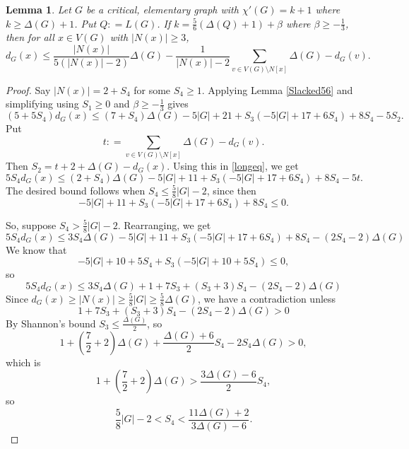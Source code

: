 \documentclass[12pt]{amsart}
\theoremstyle{plain}
\newtheorem{lem}[thm]{Lemma}
\theoremstyle{definition}
\theoremstyle{remark}
\newcommand{\card}[1]{\left|#1\right|}
\newcommand{\parens}[1]{\left( #1 \right)}
\newcommand{\DefinedAs}{\mathrel{\mathop:}=}
\begin{document}
\begin{lem}\label{DegreeBoundedForMiddling}
Let $G$ be a critical, elementary graph with $\chi'(G) = k + 1$ where $k \ge \Delta(G) + 1$.  Put $Q \DefinedAs L(G)$. 
If $k = \frac56\parens{\Delta(Q) + 1} + \beta$ where $\beta \ge -\frac13$, then for all $x \in V(G)$ with $\card{N(x)} \ge 3$,
\[d_G(x) \le \frac{\card{N(x)}}{5\parens{\card{N(x)} - 2}}\Delta(G) - \frac{1}{\card{N(x)} - 2}\sum_{v \in V(G)\setminus N[x]} \Delta(G) - d_G(v).\]
\end{lem}
\begin{proof}
Say $|N(x)| = 2 + S_4$ for some $S_4 \ge 1$.  Applying Lemma \ref{Slacked56} and simplifying using $S_1 \ge 0$ and $\beta \ge -\frac13$ gives
\begin{equation}\label{longeq}
(5+5S_4)d_G(x) \le (7 + S_4)\Delta(G) - 5|G| + 21 + S_3(-5|G| + 17 + 6S_4) + 8S_4 - 5S_2.
\end{equation}
Put 
\[t \DefinedAs \sum_{v \in V(G) \setminus N[x]} \Delta(G) - d_G(v).\]
Then $S_2 = t + 2 + \Delta(G) - d_G(x)$.  Using this in \eqref{longeq}, we get
\begin{equation}\label{longeq2}
5S_4d_G(x) \le (2 + S_4)\Delta(G) - 5|G| + 11 + S_3(-5|G| + 17 + 6S_4) + 8S_4 - 5t.
\end{equation}
The desired bound follows when $S_4 \le \frac58\card{G} - 2$, since then
\[- 5|G| + 11 + S_3(-5|G| + 17 + 6S_4) + 8S_4 \le 0.\]


So, suppose $S_4 > \frac58\card{G} - 2$. Rearranging, we get
\begin{equation}\label{longeq2}
5S_4d_G(x) \le 3S_4\Delta(G) - 5|G| + 11 + S_3(-5|G| + 17 + 6S_4) + 8S_4 - (2S_4-2)\Delta(G)
\end{equation}
We know that
\[- 5|G| + 10 + 5S_4 +S_3(-5|G| + 10 + 5S_4) \le 0,\]
so
\begin{equation}\label{longeq2}
5S_4d_G(x) \le 3S_4\Delta(G) + 1 + 7S_3 + (S_3 + 3)S_4 - (2S_4-2)\Delta(G)
\end{equation}
Since $d_G(x) \ge |N(x)| \ge \frac58|G| \ge \frac58\Delta(G)$, we have a contradiction unless
\[1 + 7S_3 + (S_3 + 3)S_4 - (2S_4-2)\Delta(G) > 0\]
By Shannon's bound $S_3 \le \frac{\Delta(G)}{2}$, so 
\[1 + \parens{\frac72 + 2}\Delta(G) + \frac{\Delta(G)+6}{2}S_4 - 2S_4\Delta(G) > 0,\]
which is
\[1 + \parens{\frac72 + 2}\Delta(G) > \frac{3\Delta(G)-6}{2}S_4,\]
so
\[\frac58|G| - 2 < S_4 < \frac{11\Delta(G)+2}{3\Delta(G)-6}.\]

\end{proof}
\end{document}
